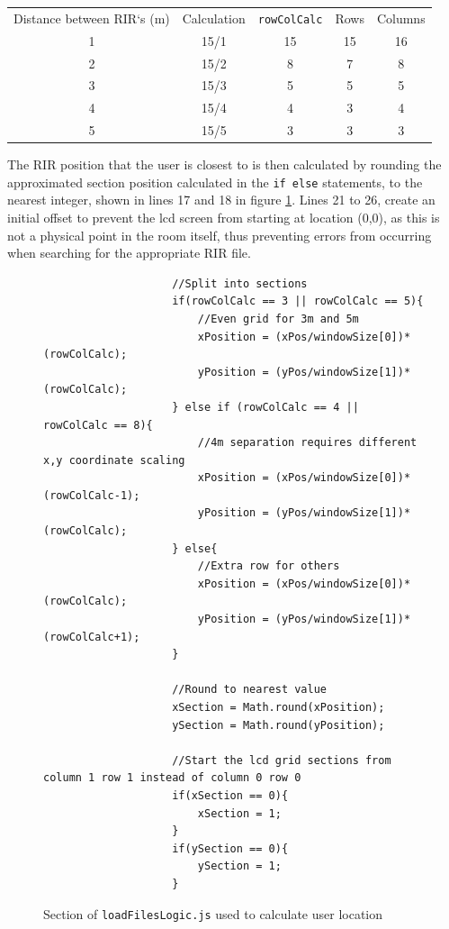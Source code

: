 \documentclass[../../main.tex]{subfiles}
\begin{document}
				\vspace{5mm}

					\begin{center}
					\begin{tabular}{c c c c c}
						Distance between \ac{RIR}`s (m) & Calculation & \texttt{rowColCalc} & Rows & Columns\\
						1 & 15/1 & 15 & 15 & 16\\
						2 & 15/2 & 8 & 7 & 8\\
						3 & 15/3 & 5 & 5 & 5\\
						4 & 15/4 & 4 & 3 & 4\\
						5 & 15/5 & 3 & 3 & 3\\
					\end{tabular}
				\end{center}

				\vspace{5mm}

				The \ac{RIR} position that the user is closest to is then calculated by rounding the approximated section position calculated in the \texttt{if else} statements, to the nearest integer, shown in lines 17 and 18 in figure \ref{jsPosition}. Lines 21 to 26, create an initial offset to prevent the lcd screen from starting at location (0,0), as this is not a physical point in the room itself, thus preventing errors from occurring when searching for the appropriate \ac{RIR} file.

				\begin{figure}[H]
				\begin{lstlisting}
					//Split into sections
					if(rowColCalc == 3 || rowColCalc == 5){
						//Even grid for 3m and 5m
						xPosition = (xPos/windowSize[0])*(rowColCalc);
						yPosition = (yPos/windowSize[1])*(rowColCalc);
					} else if (rowColCalc == 4 || rowColCalc == 8){
						//4m separation requires different x,y coordinate scaling
						xPosition = (xPos/windowSize[0])*(rowColCalc-1);
						yPosition = (yPos/windowSize[1])*(rowColCalc);
					} else{
						//Extra row for others
						xPosition = (xPos/windowSize[0])*(rowColCalc); 
						yPosition = (yPos/windowSize[1])*(rowColCalc+1);
					}	

					//Round to nearest value
					xSection = Math.round(xPosition);
					ySection = Math.round(yPosition); 
					
					//Start the lcd grid sections from column 1 row 1 instead of column 0 row 0
					if(xSection == 0){
						xSection = 1; 
					}
					if(ySection == 0){
						ySection = 1;
					}
					\end{lstlisting}
					\caption{Section of \texttt{loadFilesLogic.js} used to calculate user location}
					\label{jsPosition}
					\end{figure}
\end{document}
